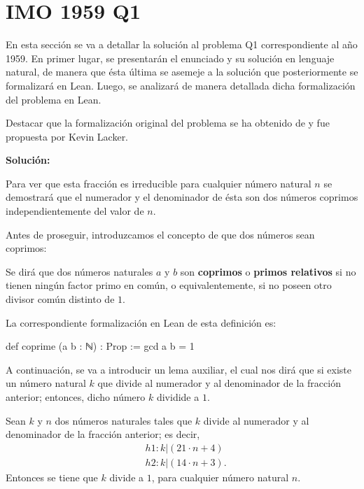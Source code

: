 \section{IMO 1959 Q1}

En esta sección se va a detallar la solución al problema Q1
correspondiente al año 1959. En primer lugar, se presentarán el
enunciado y su solución en lenguaje natural, de manera que ésta última
se asemeje a la solución que posteriormente se formalizará en
Lean. Luego, se analizará de manera detallada dicha formalización del
problema en Lean.

Destacar que la formalización original del problema se ha
obtenido de \cite{KL} y fue propuesta por Kevin Lacker.

\noindent
{}

\textbf{Solución:}

Para ver que esta fracción es irreducible para cualquier número natural
\(n\) se demostrará que el numerador y el denominador de ésta son dos
números coprimos independientemente del valor de \(n\).

Antes de proseguir, introduzcamos el concepto de que dos números sean
coprimos:

\begin{definicion}\label{coprimos}
  Se dirá que dos números naturales \(a\) y \(b\) son \textbf{coprimos}
  o \textbf{primos relativos} si no tienen ningún factor primo en común,
  o equivalentemente, si no poseen otro divisor común distinto de \(1\).
\end{definicion}

La correspondiente formalización en Lean de esta definición es:

\begin{leancode}
  def coprime (a b : ℕ) : Prop := gcd a b = 1
\end{leancode}

A continuación, se va a introducir un lema auxiliar, el cual nos dirá
que si existe un número natural \(k\) que divide al numerador y al
denominador de la fracción anterior; entonces, dicho número \(k\)
dividide a \(1\).

\begin{lema}[Auxiliar]\label{lema}
  Sean \(k\) y \(n\) dos números naturales tales que \(k\) divide al
  numerador y al denominador de la fracción anterior; es decir,
  \begin{align}
    &h1: k | (21⋅n+4)   \label{k1} \\
    &h2: k | (14⋅n+3).  \label{k2}
  \end{align}
  Entonces se tiene que \(k\) divide a \(1\), para cualquier número
  natural \(n\).
\end{lema}

